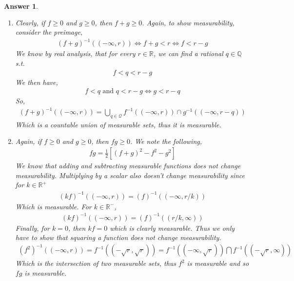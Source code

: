 \documentclass[12pt]{article}
\theoremstyle{colon}
\newtheorem*{answer}{Answer}
\begin{document}
\begin{answer}
\begin{enumerate}[label=\alph*)]
    \item Clearly, if $f \geq 0$ and $g \geq 0$, then $f + g \geq 0$. Again, to show measurability, consider the preimage,
      \begin{gather*}
        (f + g)^{-1}((-\infty, r)) \Leftrightarrow f + g < r \Leftrightarrow f < r - g
      \end{gather*}
      We know by real analysis, that for every $r \in \mathbb{R}$, we can find a rational $q \in \mathbb{Q}$ s.t.
      \begin{gather*}
        f < q < r - g
      \end{gather*}
      We then have,
      \begin{gather*}
        f < q \text{ and } q < r - g \Leftrightarrow g < r - q
      \end{gather*}
      So,
      \begin{gather*}
        (f + g)^{-1}((-\infty, r)) = \bigcup_{q \in \mathcal{Q}} f^{-1}((-\infty, r)) \cap g^{-1}((-\infty, r - q))
      \end{gather*}
      Which is a countable union of measurable sets, thus it is measurable.
    \item Again, if $f \geq 0$ and $g \geq 0$, then $fg \geq 0$. We note the following,
      \begin{gather*}
        fg = \frac{1}{2} \left[ (f+g)^2 - f^2 - g^2 \right]
      \end{gather*}
      We know that adding and subtracting measurable functions does not change measurability. Multiplying by a scalar also doesn't change measurability since for $k \in \mathbb{R}^+$
      \begin{gather*}
        (kf)^{-1}((-\infty, r)) = (f)^{-1}((-\infty, r/k))
      \end{gather*}
      Which is measurable. For $k \in \mathbb{R}^-$,
      \begin{gather*}
        (kf)^{-1}((-\infty, r)) = (f)^{-1}((r/k, \infty))
      \end{gather*}
      Finally, for $k = 0$, then $kf = 0$ which is clearly measurable.
      Thus we only have to show that squaring a function does not change measurability.
      \begin{gather*}
        (f^2)^{-1}((-\infty, r)) = f^{-1}((-\sqrt{r}, \sqrt{r})) = f^{-1}((-\infty, \sqrt{r})) \bigcap f^{-1}((-\sqrt{r}, \infty))
      \end{gather*}
      Which is the intersection of two measurable sets, thus $f^2$ is measurable and so $fg$ is measurable.
  \end{enumerate}
\end{answer}
\end{document}
